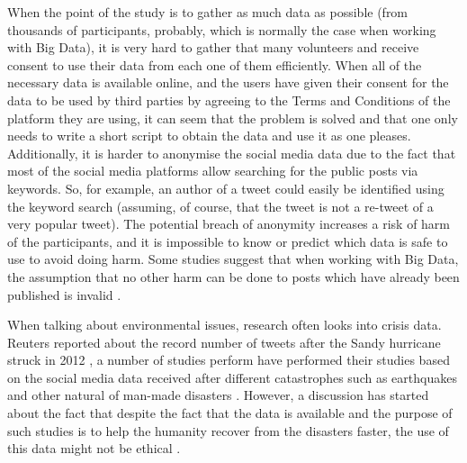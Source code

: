 When the point of the study is to gather as much data as possible (from thousands of participants, probably, which is normally the case when working with Big Data), it is very hard to gather that many volunteers and receive consent to use their data from each one of them efficiently. When all of the necessary data is available online, and the users have given their consent for the data to be used by third parties by agreeing to the Terms and Conditions of the platform they are using, it can seem that the problem is solved and that one only needs to write a short script to obtain the data and use it as one pleases. 
Additionally, it is harder to anonymise the social media data due to the fact that most of the social media platforms allow searching for the public posts via keywords. So, for example, an author of a tweet could easily be identified using the keyword search (assuming, of course, that the tweet is not a re-tweet of a very popular tweet). The potential breach of anonymity increases a risk of harm of the participants, and it is impossible to know or predict which data is safe to use to avoid doing harm. Some studies suggest that when working with Big Data, the assumption that no other harm can be done to posts which have already been published is invalid \cite{humansubjectsbigdata}. 

When talking about environmental issues, research often looks into crisis data. Reuters reported about the record number of tweets after the Sandy hurricane struck in 2012 \cite{reuterssandy}, a number of studies perform have performed their studies based on the social media data received after different catastrophes such as earthquakes \cite{earthquakes} and other natural of man-made disasters \cite{haiti}.
However, a discussion has started about the fact that despite the fact that the data is available and the purpose of such studies is to help the humanity recover from the disasters faster, the use of this data might not be ethical \cite{crisisdata}. 

